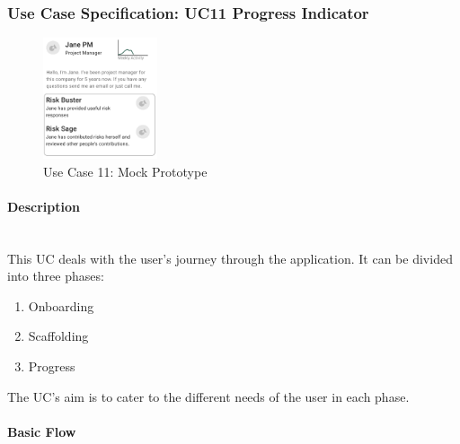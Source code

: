 
\newpage
\subsubsection{Use Case Specification: \ac{UC}11 Progress Indicator}
\label{sec:domainBbl}
\begin{figure}
	\includegraphics[width=0.3\textwidth]{Assets/UC_Screenshots/UC11S.png}
	\caption{Use Case 11: Mock Prototype}
	\label{fig:useCase11Detail}
\end{figure}

\paragraph*{Description}\mbox{}\\
This \ac{UC} deals with the user's journey through the application. 
It can be divided into three phases:
\begin{enumerate}
	\vspace{-3mm}
	\setlength\itemsep{-1em}
	
	\item Onboarding
	\item Scaffolding
	\item Progress
\end{enumerate}
\noindent
The \ac{UC}'s aim is to cater to the different needs of the user in each phase.
\\
\paragraph*{Basic Flow} \mbox{}\\

